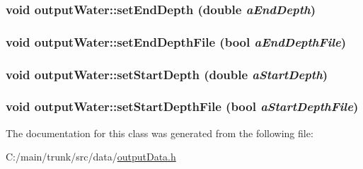 \label{classoutput_water_a97c06dddb83eb66a807c6566f62ac0d1}
\hypertarget{classoutput_water_ad6b2243ae9ff2bc9d251f32c4249f4aa}{
\subsubsection[{setEndDepth}]{\setlength{\rightskip}{0pt plus 5cm}void outputWater::setEndDepth (double {\em aEndDepth})}}
\label{classoutput_water_ad6b2243ae9ff2bc9d251f32c4249f4aa}
\hypertarget{classoutput_water_aa27e9da2e329ce41625a494745a9a594}{
\subsubsection[{setEndDepthFile}]{\setlength{\rightskip}{0pt plus 5cm}void outputWater::setEndDepthFile (bool {\em aEndDepthFile})}}
\label{classoutput_water_aa27e9da2e329ce41625a494745a9a594}
\hypertarget{classoutput_water_a18db06697bce4f493e43167e2136b84b}{
\subsubsection[{setStartDepth}]{\setlength{\rightskip}{0pt plus 5cm}void outputWater::setStartDepth (double {\em aStartDepth})}}
\label{classoutput_water_a18db06697bce4f493e43167e2136b84b}
\hypertarget{classoutput_water_af4819352d8eb0448dc3be329e5b76150}{
\subsubsection[{setStartDepthFile}]{\setlength{\rightskip}{0pt plus 5cm}void outputWater::setStartDepthFile (bool {\em aStartDepthFile})}}
\label{classoutput_water_af4819352d8eb0448dc3be329e5b76150}


The documentation for this class was generated from the following file:\begin{DoxyCompactItemize}
\item 
C:/main/trunk/src/data/\hyperlink{output_data_8h}{outputData.h}\end{DoxyCompactItemize}
